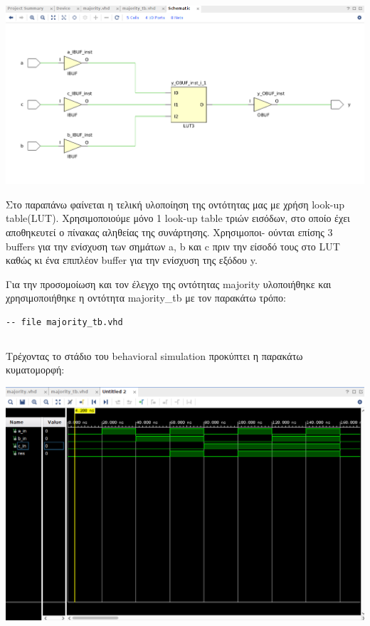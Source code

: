 \documentclass[]{article}
\begin{document}
\begin{center}
	\includegraphics[width=\textwidth]{synthesis_schem.png}
\end{center}

Στο παραπάνω φαίνεται η τελική υλοποίηση της οντότητας μας με χρήση look-up table(LUT). Χρησιμοποιούμε μόνο
1 look-up table τριών εισόδων, στο οποίο έχει αποθηκευτεί ο πίνακας αληθείας της συνάρτησης. Χρησιμοποι-
ούνται επίσης 3 buffers για την ενίσχυση των σημάτων a, b και c πριν την είσοδό τους στο LUT καθώς κι ένα επιπλέον buffer για την ενίσχυση της εξόδου y.

Για την προσομοίωση και τον έλεγχο της οντότητας majority υλοποιήθηκε και χρησιμοποιήθηκε η οντότητα majority\_tb με τον παρακάτω τρόπο:
\begin{verbatim}
-- file majority_tb.vhd
\end{verbatim}
\inputminted{vhdl}{./assign_1/majority_tb.vhdl}

Τρέχοντας το στάδιο του behavioral simulation προκύπτει η παρακάτω κυματομορφή:
\begin{center}
  \includegraphics[width=\textwidth]{behavioral.png}
\end{center}
\end{document}

